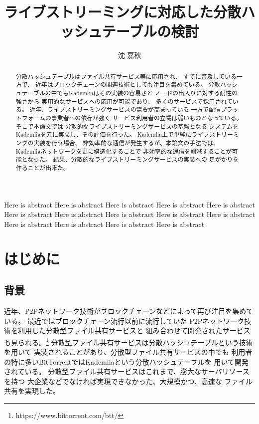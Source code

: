 \documentclass[sotsuron]{jcsie}
\title{ライブストリーミングに対応した分散ハッシュテーブルの検討}
\author{沈 嘉秋}
\begin{document}
\maketitle
\emaketitle
{}
\begin{abstract}    
	分散ハッシュテーブルはファイル共有サービス等に応用され、
	すでに普及している一方で、
	近年はブロックチェーンの関連技術としても注目を集めている。
	分散ハッシュテーブルの中でもKademliaはその実装の容易さと
	ノードの出入りに対する耐性の強さから
	実用的なサービスへの応用が可能であり、
	多くのサービスで採用されている。
	近年、ライブストリーミングサービスの需要が高まっている
	一方で配信プラットフォームの事業者への依存が強く
	サービス利用者の立場は弱いものとなっている。
	そこで本論文では
	分散的なライブストリーミングサービスの基盤となる
	システムをKademliaを元に実装し、その評価を行った。
	Kademlia上で単純にライブストリーミングの実装を行う場合、
	非効率的な通信が発生するが、本論文の手法では、
	Kademliaネットワークを更に構造化することで
	非効率的な通信を削減することが可能となった。
	結果、分散的なライブストリーミングサービスの実装への
	足がかりを作ることが出来た。
\end{abstract}
\begin{eabstract}
	Here is abstract
	Here is abstract
	Here is abstract
	Here is abstract
	Here is abstract
	Here is abstract
	Here is abstract
	Here is abstract
	Here is abstract
	Here is abstract
	Here is abstract
	Here is abstract
	Here is abstract
	Here is abstract
\end{eabstract}
\tableofcontents
{}
\chapter{はじめに}
\section{背景}
近年、P2Pネットワーク技術がブロックチェーンなどによって再び注目を集めている。
最近ではブロックチェーン流行以前に流行していた
P2Pネットワーク技術を利用した分散型ファイル共有サービスと
組み合わせて開発されたサービスも見られる。\footnote{https://www.bittorrent.com/btt/}
分散型ファイル共有サービスは分散ハッシュテーブルという技術を用いて
実装されることがあり、分散型ファイル共有サービスの中でも
利用者の特に多いBitTorrentではKademliaという分散ハッシュテーブルを
用いて開発されている。
分散型ファイル共有サービスはこれまで、膨大なサーバリソースを持つ
大企業などでなければ実現できなかった、大規模かつ、高速な
ファイル共有を実現した。
\end{document}
